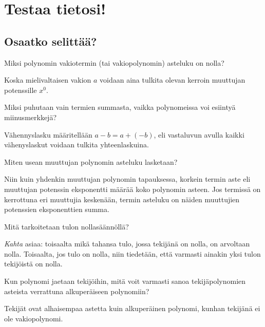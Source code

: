 \section{Testaa tietosi!}

\subsection{Osaatko selittää?}

\begin{tehtava}
Miksi polynomin vakiotermin (tai vakiopolynomin) asteluku on nolla?
	\begin{tehtava}
	Koska mielivaltaisen vakion $a$ voidaan aina tulkita olevan kerroin muuttujan potenssille $x^0$.
	\end{tehtava}
\end{tehtava}

\begin{tehtava}
Miksi puhutaan vain termien summasta, vaikka polynomeissa voi esiintyä miinusmerkkejä?
	\begin{tehtava}
	Vähennyslasku määritellään $a-b=a+(-b)$, eli vastaluvun avulla kaikki vähenyslaskut voidaan tulkita yhteenlaskuina.
	\end{tehtava}
\end{tehtava}

\begin{tehtava}
Miten usean muuttujan polynomin asteluku lasketaan?
	\begin{tehtava}
	Niin kuin yhdenkin muuttujan polynomin tapauksessa, korkein termin aste eli muuttujan potenssin eksponentti määrää koko polynomin asteen. Jos termissä on kerrottuna eri muuttujia keskenään, termin asteluku on näiden muuttujien potenssien eksponenttien summa.
	\end{tehtava}
\end{tehtava}

\begin{tehtava}
Mitä tarkoitetaan tulon nollasäännöllä?
	\begin{tehtava}
\textit{Kahta} asiaa: toisaalta mikä tahansa tulo, jossa tekijänä on nolla, on arvoltaan nolla. Toisaalta, jos tulo on nolla, niin tiedetään, että varmasti ainakin yksi tulon tekijöistä on nolla.
	\end{tehtava}
\end{tehtava}

\begin{tehtava}
Kun polynomi jaetaan tekijöihin, mitä voit varmasti sanoa tekijäpolynomien asteista verrattuna alkuperäiseen polynomiin?
	\begin{tehtava}
Tekijät ovat alhaisempaa astetta kuin alkuperäinen polynomi, kunhan tekijänä ei ole vakiopolynomi.
	\end{tehtava}
\end{tehtava}


